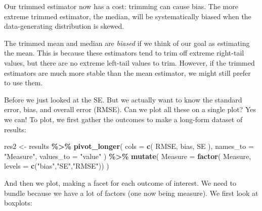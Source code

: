 \documentclass[
]{book}
\newenvironment{Shaded}{\begin{snugshade}}{\end{snugshade}}
\newcommand{\AttributeTok}[1]{\textcolor[rgb]{0.13,0.29,0.53}{#1}}
\newcommand{\DecValTok}[1]{\textcolor[rgb]{0.00,0.00,0.81}{#1}}
\newcommand{\FunctionTok}[1]{\textcolor[rgb]{0.13,0.29,0.53}{\textbf{#1}}}
\newcommand{\NormalTok}[1]{#1}
\newcommand{\OtherTok}[1]{\textcolor[rgb]{0.56,0.35,0.01}{#1}}
\newcommand{\SpecialCharTok}[1]{\textcolor[rgb]{0.81,0.36,0.00}{\textbf{#1}}}
\newcommand{\StringTok}[1]{\textcolor[rgb]{0.31,0.60,0.02}{#1}}
\begin{document}
Our trimmed estimator now has a cost: trimming can cause bias.
The more extreme trimmed estimator, the median, will be systematically biased when the data-generating distribution is skewed.

The trimmed mean and median are \emph{biased} if we think of our goal as estimating the mean.
This is because these estimators tend to trim off extreme right-tail values, but there are no extreme left-tail values to trim.
However, if the trimmed estimators are much more stable than the mean estimator, we might still prefer to use them.

Before we just looked at the SE.
But we actually want to
know the standard error, bias, and overall error (RMSE).
Can we plot all these on a single plot? Yes we can!
To plot, we first gather the outcomes to make a long-form dataset of results:

\begin{Shaded}
\begin{Highlighting}[]
\NormalTok{res2 }\OtherTok{\textless{}{-}} 
\NormalTok{  results }\SpecialCharTok{\%\textgreater{}\%}
  \FunctionTok{pivot\_longer}\NormalTok{( }
    \AttributeTok{cols =} \FunctionTok{c}\NormalTok{( RMSE, bias, SE ), }
    \AttributeTok{names\_to =} \StringTok{"Measure"}\NormalTok{,}
    \AttributeTok{values\_to =} \StringTok{"value"} 
\NormalTok{  ) }\SpecialCharTok{\%\textgreater{}\%} 
  \FunctionTok{mutate}\NormalTok{(}
    \AttributeTok{Measure =} \FunctionTok{factor}\NormalTok{( Measure, }\AttributeTok{levels =} \FunctionTok{c}\NormalTok{(}\StringTok{"bias"}\NormalTok{,}\StringTok{"SE"}\NormalTok{,}\StringTok{"RMSE"}\NormalTok{))}
\NormalTok{  )}
\end{Highlighting}
\end{Shaded}

And then we plot, making a facet for each outcome of interest.
We need to bundle because we have a lot of factors (one now being measure).
We first look at boxplots:

\begin{Shaded}
\end{Shaded}
\end{document}
